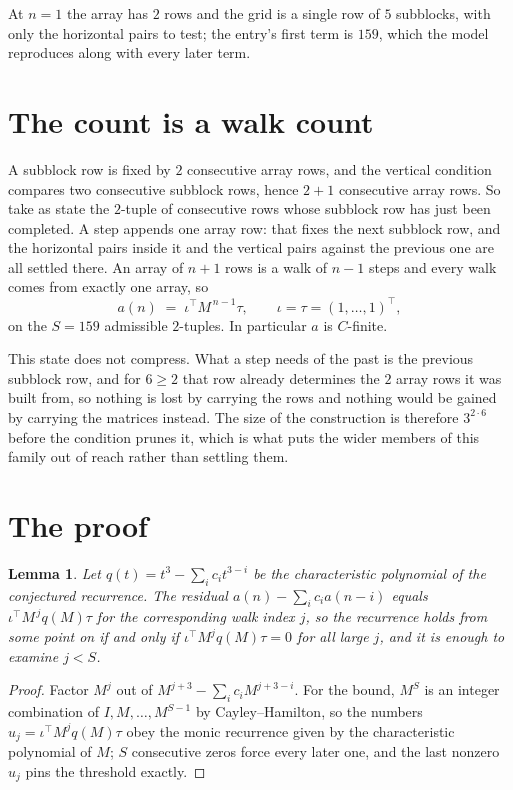 \documentclass[11pt,a4paper]{article}
\theoremstyle{plain}
\newtheorem{lemma}[theorem]{Lemma}
\theoremstyle{definition}
\begin{document}
At $n=1$ the array has $2$ rows and the grid is a single row of $5$
subblocks, with only the horizontal pairs to test; the entry's first term is
$159$, which the model reproduces along with every later term.

\section{The count is a walk count}

A subblock row is fixed by $2$ consecutive array rows, and the vertical condition compares
two consecutive subblock rows, hence $2+1$ consecutive array rows. So take as state the
$2$-tuple of consecutive rows whose subblock row has just been completed. A step appends one
array row: that fixes the next subblock row, and the horizontal pairs inside it and the
vertical pairs against the previous one are all settled there. An array of $n+1$ rows is
a walk of $n-1$ steps and every walk comes from exactly one array, so
\[
a(n)\;=\;\iota^{\!\top}M^{\,n-1}\tau,\qquad\iota=\tau=(1,\dots,1)^{\!\top},
\]
on the $S=159$ admissible $2$-tuples. In particular $a$ is $C$-finite.

This state does not compress. What a step needs of the past is the previous subblock row, and
for $6\ge2$ that row already determines the $2$ array rows it was built from, so nothing
is lost by carrying the rows and nothing would be gained by carrying the matrices instead. The
size of the construction is therefore $3^{2\cdot6}$ before the condition prunes
it, which is what puts the wider members of this family out of reach rather than settling them.

\section{The proof}

\begin{lemma}\label{lem:crit}
Let $q(t)=t^{3}-\sum_i c_it^{3-i}$ be the characteristic polynomial of the
conjectured recurrence. The residual $a(n)-\sum_ic_ia(n-i)$ equals
$\iota^{\!\top}M^{\,j}q(M)\tau$ for the corresponding walk index $j$, so the recurrence
holds from some point on if and only if $\iota^{\!\top}M^{j}q(M)\tau=0$ for all large $j$,
and it is enough to examine $j<S$.
\end{lemma}

\begin{proof}
Factor $M^{j}$ out of $M^{j+3}-\sum_ic_iM^{j+3-i}$. For the bound, $M^{S}$
is an integer combination of $I,M,\dots,M^{S-1}$ by Cayley--Hamilton, so the numbers
$u_j=\iota^{\!\top}M^{j}q(M)\tau$ obey the monic recurrence given by the characteristic
polynomial of $M$; $S$ consecutive zeros force every later one, and the last nonzero $u_j$
pins the threshold exactly.
\end{proof}
\end{document}
